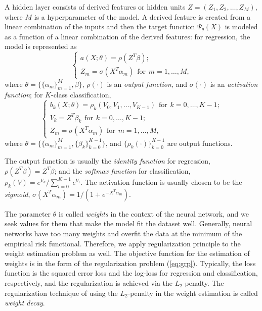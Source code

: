 \documentclass[12pt]{article}
\begin{document}
A hidden layer consists of derived features or hidden units $Z = (Z_1,Z_2,\dots,Z_M)$, where $M$ is a hyperparameter of the model. A derived feature is created from a linear combination of the inputs and then the target function $\Psi_{\theta}(X)$ is modeled as a function of a linear combination of the derived features: for regression, the model is represented as
\begin{equation*}
\begin{cases}
a(X;\theta) = \rho(Z^T \beta);\\
Z_m = \sigma(X^T \alpha_m) \hspace{5pt} \text{for} \hspace{5pt} m = 1,\dots,M,
\end{cases}
\end{equation*}
where $\theta = \{\{\alpha_m\}_{m=1}^M,\beta\}$, $\rho(\cdot)$ is an {\it output function}, and $\sigma(\cdot)$ is an {\it activation function}; for $K$-class classification,
\begin{equation*}
\begin{cases}
b_k(X;\theta) = \rho_k(V_0,V_1,\dots,V_{K-1}) \hspace{5pt} \text{for} \hspace{5pt} k = 0,\dots,K-1;\\
V_k = Z^T \beta_k \hspace{5pt} \text{for} \hspace{5pt} k = 0,\dots,K-1;\\
Z_m = \sigma(X^T \alpha_m) \hspace{5pt} \text{for} \hspace{5pt} m = 1,\dots,M,
\end{cases}
\end{equation*}
where $\theta = \{\{\alpha_m\}_{m=1}^M,\{\beta_k\}_{k=0}^{K-1}\}$, and $\{\rho_k(\cdot)\}_{k=0}^{K-1}$ are output functions.

The output function is usually the {\it identity function} for regression, $\rho(Z^T \beta) = Z^T \beta$; and the {\it softmax function} for classification, $\rho_k(V) = e^{V_k}/\sum_{l=0}^{K-1} e^{V_l}$. The activation function is usually chosen to be the {\it sigmoid}, $\sigma(X^T \alpha_m) = 1/(1+e^{-X^T \alpha_m})$.

The parameter $\theta$ is called {\it weights} in the context of the neural network, and we seek values for them that make the model fit the dataset well. Generally, neural networks have too many weights and overfit the data at the minimum of the empirical risk functional. Therefore, we apply regularization principle to the weight estimation problem as well. The objective function for the estimation of weights is in the form of the regularization problem (\ref{eq:grp}). Typically, the loss function is the squared error loss and the log-loss for regression and classification, respectively, and the regularization is achieved via the $L_2$-penalty. The regularization technique of using the $L_2$-penalty in the weight estimation is called {\it weight decay}.
\end{document}
